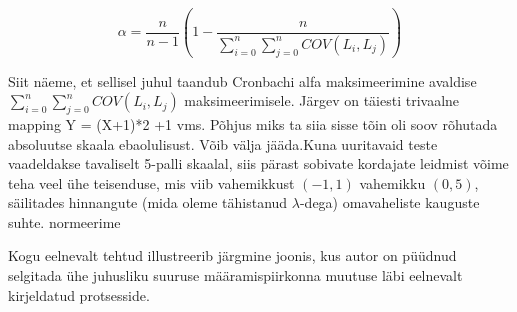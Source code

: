 \documentclass[a4paper]{article}
\numberwithin{equation}{section}
\theoremstyle{definition}
\begin{document}
\begin{equation}
\alpha = \frac{n}{n-1}\left(1 - \frac
{n}{\sum \limits_{i=0}^n \sum \limits_{j=0}^n COV(L_i,L_j)}\right)
\end{equation}

Siit näeme, et sellisel juhul taandub Cronbachi alfa maksimeerimine avaldise $\sum \limits_{i=0}^n \sum \limits_{j=0}^n COV(L_i,L_j)$ maksimeerimisele. {\color{cyan} Järgev on täiesti trivaalne mapping Y = (X+1)*2 +1 vms. Põhjus miks ta siia sisse tõin oli soov rõhutada absoluutse skaala ebaolulisust. Võib välja jääda.}Kuna uuritavaid teste vaadeldakse tavaliselt 5-palli skaalal, siis pärast sobivate kordajate leidmist võime teha veel \"uhe teisenduse, mis viib vahemikkust $(-1,1)$ vahemikku $(0,5)$, säilitades hinnangute (mida oleme tähistanud $\lambda$-dega) omavaheliste kauguste suhte. {\color{cyan} normeerime } 

Kogu eelnevalt tehtud illustreerib järgmine joonis, kus autor on p\"u\"udnud selgitada \"uhe juhusliku suuruse määramispiirkonna muutuse läbi eelnevalt kirjeldatud protsesside. 
\end{document}
